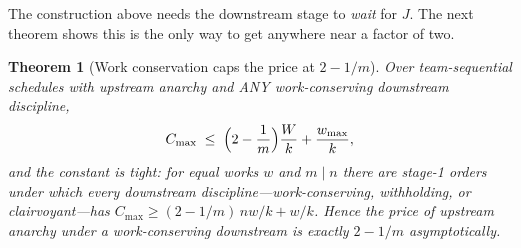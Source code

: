 \documentclass[sn-mathphys,NameDate]{sn-jnl}
\theoremstyle{thmstyleone}
\newtheorem{theorem}{Theorem}
\theoremstyle{thmstylethree}
\theoremstyle{thmstyletwo}
\begin{document}
The construction above needs the downstream stage to \emph{wait}
for $J$. The next theorem shows this is the only way to get
anywhere near a factor of two.

\begin{theorem}[Work conservation caps the price at $2 - 1/m$]
\label{thm:poa-wc}
Over team-sequential schedules with upstream anarchy and ANY
work-conserving downstream discipline,
\[
C_{\max} \;\le\; \Bigl(2 - \frac{1}{m}\Bigr)\frac{W}{k}
+ \frac{w_{\max}}{k},
\]
and the constant is tight: for equal works $w$ and $m \mid n$ there
are stage-1 orders under which \emph{every} downstream
discipline---work-conserving, withholding, or clairvoyant---has
$C_{\max} \ge (2 - 1/m)\,nw/k + w/k$. Hence the price of upstream
anarchy under a work-conserving downstream is exactly $2 - 1/m$
asymptotically.
\end{theorem}
\end{document}
